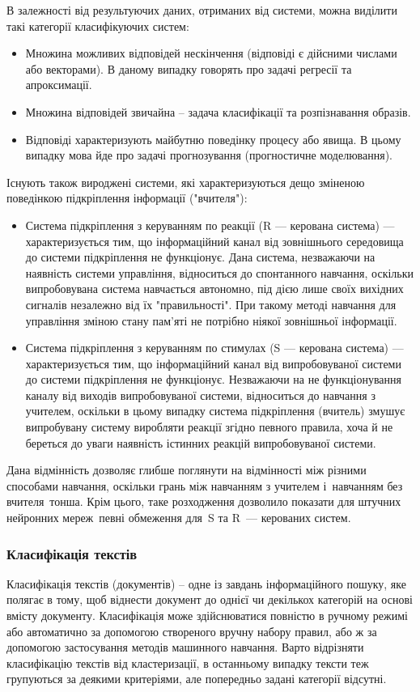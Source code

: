 В залежності від результуючих даних, отриманих від системи, можна виділити такі категорії класифікуючих систем:
\begin{itemize}  
	\item Множина можливих відповідей нескінчення (відповіді є дійсними числами або векторами). В даному випадку говорять про задачі регресії та апроксимації.
	\item Множина відповідей звичайна – задача класифікації та розпізнавання образів.
	\item Відповіді характеризують майбутню поведінку процесу або явища. В цьому випадку мова йде про задачі прогнозування (прогностичне моделювання).
\end{itemize}

Існують також вироджені системи, які характеризуються дещо зміненою поведінкою підкріплення інформації ("вчителя"):
\begin{itemize}  
	\item Система підкріплення з керуванням по реакції (R — керована система) — характеризується тим, що інформаційний канал від зовнішнього середовища до системи підкріплення не функціонує. Дана система, незважаючи на наявність системи управління, відноситься до спонтанного навчання, оскільки випробовувана система навчається автономно, під дією лише своїх вихідних сигналів незалежно від їх "правильності". При такому методі навчання для управління зміною стану пам'яті не потрібно ніякої зовнішньої інформації.
	\item Система підкріплення з керуванням по стимулах (S — керована система) — характеризується тим, що інформаційний канал від випробовуваної системи до системи підкріплення не функціонує. Незважаючи на не функціонування каналу від виходів випробовуваної системи, відноситься до навчання з учителем, оскільки в цьому випадку система підкріплення (вчитель) змушує випробувану систему виробляти реакції згідно певного правила, хоча й не береться до уваги наявність істинних реакцій випробовуваної системи.
\end{itemize}

Дана відмінність дозволяє глибше поглянути на відмінності між різними способами навчання, оскільки грань між навчанням з учителем і навчанням без вчителя тонша. Крім цього, таке розходження дозволило показати для штучних нейронних мереж певні обмеження для S та R — керованих систем.

\subsubsection{Класифікація текстів}
Класифікація текстів (документів) – одне із завдань інформаційного пошуку, яке полягає в тому, щоб віднести документ до однієї чи декількох категорій на основі вмісту документу. Класифікація може здійснюватися повністю в ручному режимі або автоматично за допомогою створеного вручну набору правил, або ж за допомогою застосування методів машинного навчання. Варто відрізняти класифікацію текстів від кластеризації, в останньому випадку тексти теж групуються за деякими критеріями, але попередньо задані категорії відсутні.

